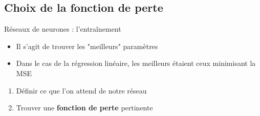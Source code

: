 \documentclass[aspectratio=169, 14pt]{beamer} %
\begin{document}
	
	\subsection{Choix de la fonction de perte}
	
	
	\begin{frame}[t]{Réseaux de neurones : l'entraînement}
		\begin{itemize}[<+->]
			\item Il s'agit de trouver les "meilleurs" paramètres 
			\item Dans le cas de la régression linéaire, les meilleurs étaient ceux minimisant la MSE
		\end{itemize}
		\vspace{\baselineskip}
		\vspace{\baselineskip}
		\pause
		\begin{enumerate}[<+->]
			\item Définir ce que l'on attend de notre réseau
			\item Trouver une \textbf{fonction de perte} pertinente
		\end{enumerate}
	\end{frame}
	
\end{document}
